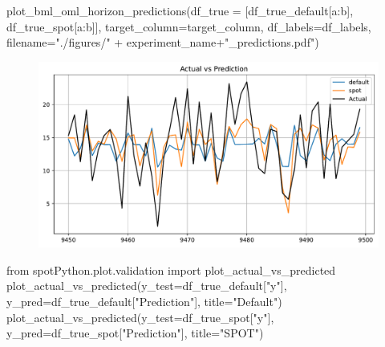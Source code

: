 \documentclass[
  letterpaper,
  DIV=11,
  numbers=noendperiod]{scrreprt}
\newenvironment{Shaded}{\begin{snugshade}}{\end{snugshade}}
\newcommand{\ImportTok}[1]{\textcolor[rgb]{0.00,0.46,0.62}{#1}}
\newcommand{\NormalTok}[1]{\textcolor[rgb]{0.00,0.23,0.31}{#1}}
\newcommand{\OperatorTok}[1]{\textcolor[rgb]{0.37,0.37,0.37}{#1}}
\newcommand{\StringTok}[1]{\textcolor[rgb]{0.13,0.47,0.30}{#1}}
\begin{document}
\begin{Shaded}
\begin{Highlighting}[]
\NormalTok{plot\_bml\_oml\_horizon\_predictions(df\_true }\OperatorTok{=}\NormalTok{ [df\_true\_default[a:b], df\_true\_spot[a:b]], target\_column}\OperatorTok{=}\NormalTok{target\_column,  df\_labels}\OperatorTok{=}\NormalTok{df\_labels, filename}\OperatorTok{=}\StringTok{"./figures/"} \OperatorTok{+}\NormalTok{ experiment\_name}\OperatorTok{+}\StringTok{"\_predictions.pdf"}\NormalTok{)}
\end{Highlighting}
\end{Shaded}

\begin{figure}[H]

{\centering \includegraphics{13_spot_hpt_river_files/figure-pdf/cell-35-output-1.pdf}

}

\end{figure}

\begin{Shaded}
\begin{Highlighting}[]
\ImportTok{from}\NormalTok{ spotPython.plot.validation }\ImportTok{import}\NormalTok{ plot\_actual\_vs\_predicted}
\NormalTok{plot\_actual\_vs\_predicted(y\_test}\OperatorTok{=}\NormalTok{df\_true\_default[}\StringTok{"y"}\NormalTok{], y\_pred}\OperatorTok{=}\NormalTok{df\_true\_default[}\StringTok{"Prediction"}\NormalTok{], title}\OperatorTok{=}\StringTok{"Default"}\NormalTok{)}
\NormalTok{plot\_actual\_vs\_predicted(y\_test}\OperatorTok{=}\NormalTok{df\_true\_spot[}\StringTok{"y"}\NormalTok{], y\_pred}\OperatorTok{=}\NormalTok{df\_true\_spot[}\StringTok{"Prediction"}\NormalTok{], title}\OperatorTok{=}\StringTok{"SPOT"}\NormalTok{)}
\end{Highlighting}
\end{Shaded}
\end{document}
